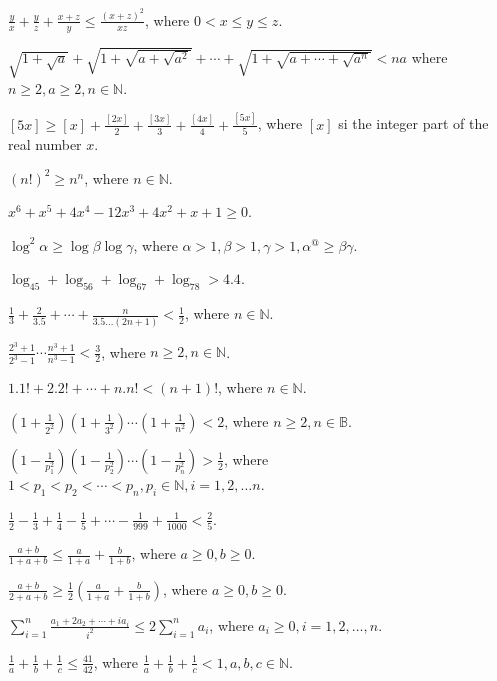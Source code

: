\item $\frac{y}{x} + \frac{y}{z} + \frac{x + z}{y}\leq \frac{(x + z)^2}{xz}$, where $0< x\leq y\leq z$.
\item $\sqrt{1 + \sqrt{a}} + \sqrt{1 + \sqrt{a + \sqrt{a^2}}} + \cdots + \sqrt{1 + \sqrt{a + \cdots + \sqrt{a^n}}} < na$ where $n
  \geq 2, a\geq 2, n\in\mathbb{N}$.
\item $[5x]\geq [x] + \frac{[2x]}{2} + \frac{[3x]}{3} + \frac{[4x]}{4} + \frac{[5x]}{5}$, where $[x]$ si the integer part of the
  real number $x$.
\item $(n!)^2 \geq n^n$, where $n\in\mathbb{N}$.
\item $x^6 + x^5 + 4x^4 - 12x^3 + 4x^2 + x + 1\geq 0$.
\item $\log^2\alpha\geq \log\beta\log\gamma$, where $\alpha>1, \beta>1, \gamma>1, \alpha^@\geq\beta\gamma$.
\item $\log_45 + \log_56 + \log_67 + \log_78> 4.4$.
\item $\frac{1}{3} + \frac{2}{3.5} + \cdots + \frac{n}{3.5\ldots(2n + 1)} < \frac{1}{2}$, where $n\in\mathbb{N}$.
\item $\frac{2^3 + 1}{2^3 - 1}\cdots\frac{n^3 + 1}{n^3 - 1}< \frac{3}{2}$, where $n\geq 2, n\in\mathbb{N}$.
\item $1.1! + 2.2! + \cdots + n.n! < (n + 1)!$, where $n\in\mathbb{N}$.
\item $\left(1 + \frac{1}{2^2}\right)\left(1 + \frac{1}{3^2}\right)\cdots\left(1 + \frac{1}{n^2}\right) < 2$, where $n\geq 2,
  n\in\mathbb{B}$.
\item $\left(1 - \frac{1}{p_1^2}\right)\left(1 - \frac{1}{p_2^2}\right)\cdots\left(1 - \frac{1}{p_n^2}\right) > \frac{1}{2}$, where
  $1 < p_1 < p_2 <\cdots < p_n, p_i\in\mathbb{N}, i = 1, 2, \ldots n$.
\item $\frac{1}{2} - \frac{1}{3} + \frac{1}{4} - \frac{1}{5} + \cdots - \frac{1}{999} + \frac{1}{1000}<\frac{2}{5}$.
\item $\frac{a + b}{1 + a + b}\leq \frac{a}{1 + a} + \frac{b}{1 + b}$, where $a\geq 0, b\geq 0$.
\item $\frac{a + b}{2 + a + b}\geq \frac{1}{2}\left(\frac{a}{1 + a} + \frac{b}{1 + b}\right)$, where $a\geq 0, b\geq 0$.
\item $\displaystyle\sum_{i=1}^n\frac{a_1 + 2a_2 + \cdots + ia_i}{i^2}\leq 2\sum_{i=1}^na_i$, where $a_i\geq 0, i=1, 2, \ldots, n$.
\item $\frac{1}{a} + \frac{1}{b} + \frac{1}{c}\leq \frac{41}{42}$, where $\frac{1}{a} + \frac{1}{b} + \frac{1}{c}< 1, a, b,
  c\in\mathbb{N}$.
